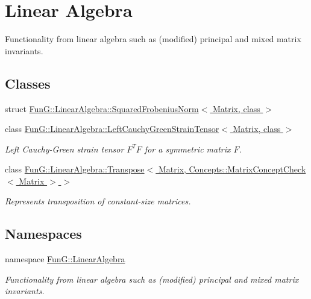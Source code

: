 \hypertarget{group__LinearAlgebraGroup}{\section{\-Linear \-Algebra}
\label{group__LinearAlgebraGroup}
}


\-Functionality from linear algebra such as (modified) principal and mixed matrix invariants.  


\subsection*{\-Classes}
\begin{DoxyCompactItemize}
\item 
struct \hyperlink{structFunG_1_1LinearAlgebra_1_1SquaredFrobeniusNorm}{\-Fun\-G\-::\-Linear\-Algebra\-::\-Squared\-Frobenius\-Norm$<$ Matrix, class $>$}
\item 
class \hyperlink{classFunG_1_1LinearAlgebra_1_1LeftCauchyGreenStrainTensor}{\-Fun\-G\-::\-Linear\-Algebra\-::\-Left\-Cauchy\-Green\-Strain\-Tensor$<$ Matrix, class $>$}
\begin{DoxyCompactList}\small\item\em \-Left \-Cauchy-\/\-Green strain tensor $ F^T F $ for a symmetric matrix $ F $. \end{DoxyCompactList}\item 
class \hyperlink{classFunG_1_1LinearAlgebra_1_1Transpose_3_01Matrix_00_01Concepts_1_1MatrixConceptCheck_3_01Matrix_01_4_01_4}{\-Fun\-G\-::\-Linear\-Algebra\-::\-Transpose$<$ Matrix, Concepts\-::\-Matrix\-Concept\-Check$<$ Matrix $>$ $>$}
\begin{DoxyCompactList}\small\item\em \-Represents transposition of constant-\/size matrices. \end{DoxyCompactList}\end{DoxyCompactItemize}
\subsection*{\-Namespaces}
\begin{DoxyCompactItemize}
\item 
namespace \hyperlink{namespaceFunG_1_1LinearAlgebra}{\-Fun\-G\-::\-Linear\-Algebra}
\begin{DoxyCompactList}\small\item\em \-Functionality from linear algebra such as (modified) principal and mixed matrix invariants. \end{DoxyCompactList}\end{DoxyCompactItemize}
